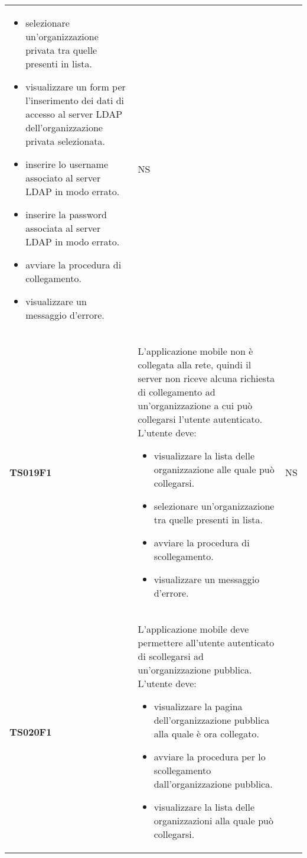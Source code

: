 \documentclass[../piano-di-qualifica.tex]{subfiles}
\begin{document}
\begin{centering}
\begin{longtable}[H]{>{\centering\bfseries}m{3cm} >{}p{10cm} >{\centering\arraybackslash}m{3cm}}
\begin{itemize}
                          \item selezionare un'organizzazione privata tra quelle presenti in lista.
                          \item visualizzare un form per l'inserimento dei dati di accesso al server LDAP dell'organizzazione privata selezionata.
                          \item inserire lo username associato al server LDAP in modo errato.
                          \item inserire la password associata al server LDAP in modo errato.
                          \item avviare la procedura di collegamento.
                          \item visualizzare un messaggio d'errore.
                        \end{itemize}
                    & NS \\
        TS019F1     & L'applicazione mobile non è collegata alla rete, quindi il server non riceve alcuna richiesta di collegamento ad un'organizzazione a cui può collegarsi l'utente autenticato. \newline
                    L'utente deve:
                      \begin{itemize}
                        \item visualizzare la lista delle organizzazione alle quale può collegarsi.
                        \item selezionare un'organizzazione tra quelle presenti in lista.
                        \item avviare la procedura di scollegamento.
                        \item visualizzare un messaggio d'errore.
                      \end{itemize}
                    & NS \\
        TS020F1     & L'applicazione mobile deve permettere all'utente autenticato di scollegarsi ad un'organizzazione pubblica. \newline
                      L'utente deve:
                        \begin{itemize}
                          \item visualizzare la pagina dell'organizzazione pubblica alla quale è ora collegato.
                          \item avviare la procedura per lo scollegamento dall'organizzazione pubblica.
                          \item visualizzare la lista delle organizzazioni alla quale può collegarsi.

\end{itemize}
\end{longtable}
\end{centering}
\end{document}

